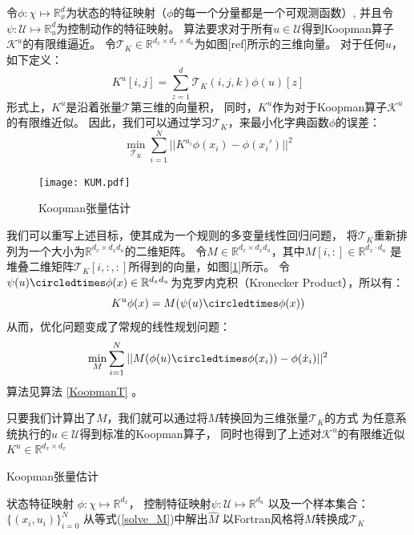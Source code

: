 \documentclass[AutoFakeBold]{LZUThesis}
\begin{document}
令$\phi : \chi \mapsto \mathbb{R}^d_x$为状态的特征映射（$\phi$的每一个分量都是一个可观测函数）,
并且令$\psi: \mathcal{U} \mapsto \mathbb{R}^d_u$为控制动作的特征映射。
算法要求对于所有$u \in \mathcal{U}$得到Koopman算子$\mathcal{K}^u$的有限维逼近。
令$\mathcal{T}_{K} \in \mathbb{R}^{d_x \times d_x \times d_u}$为如图[ref]所示的三维向量。
对于任何$u$，如下定义：
\begin{equation}
  K^u[i, j] = \sum_{z = 1}^{d} \mathcal{T}_K (i, j, k) \phi(u)[z]
\end{equation}
形式上，$K^u$是沿着张量$\mathcal{T}$第三维的向量积，
同时，$K^u$作为对于Koopman算子$\mathcal{K}^u$的有限维近似。
因此，我们可以通过学习$\mathcal{T}_K$，来最小化字典函数$\phi$的误差：
\begin{equation}
  \min_{\mathcal{T}_K} \sum_{i = 1}^{N} || K^{u_i} \phi(x_i) - \phi(x_i') ||^2
\end{equation}
\begin{figure}[htbp]
  \centering
  \texttt{[image: KUM.pdf]}
  \caption{Koopman张量估计}
  \label{KUM}
\end{figure}
我们可以重写上述目标，使其成为一个规则的多变量线性回归问题，
将$\mathcal{T}_K$重新排列为一个大小为$\mathbb{R}^{d_x \times d_x d_u}$的二维矩阵。
令$M \in \mathbb{R}^{d_x \times d_x d_u}$，其中$M[i,:] \in \mathbb{R}^{d_x \cdot d_u}$
是堆叠二维矩阵$\mathcal{T}_K[i, :, :]$所得到的向量，如图[\ref{KUM}]所示。
令$\psi(u) \circledtimes \phi(x) \in \mathbb{R}^{d_x d_u}$为克罗内克积（Kronecker Product），所以有：
\begin{equation}
  K^u \phi(x) = M(\psi(u) \circledtimes \phi(x))
\end{equation}
从而，优化问题变成了常规的线性规划问题：
\begin{equation}
  \min_{M} \sum_{i = 1}^{N} || M(\phi(u) \circledtimes \phi(x_i)) - \phi(\dot x_i) ||^2
  \label{solve_M}
\end{equation}
算法见算法 \ref{KoopmanT} 。

只要我们计算出了$M$，我们就可以通过将$M$转换回为三维张量$\mathcal{T}_K$的方式
为任意系统执行的$u \in \mathcal{U}$得到标准的Koopman算子，
同时也得到了上述对$\mathcal{K}^u$的有限维近似$K^u \in \mathbb{R}^{d_x \times d_x}$

\begin{algorithm}[htbp]
  \caption{Koopman张量估计}
  \label{KoopmanT}
  \begin{algorithmic}[1]
    \Require 状态特征映射 $\phi : \chi \mapsto \mathbb{R}^{d_x}$，
    控制特征映射$\psi : \mathcal{U} \mapsto \mathbb{R}^{d_u}$
    以及一个样本集合：$\{(x_i, u_i)\}_{i = 0}^{N}$
    \State 从等式(\ref{solve_M})中解出$\hat{M}$
    \State 以Fortran风格将$M$转换成$\mathcal{T}_K$
  \end{algorithmic}
\end{algorithm}
\end{document}
